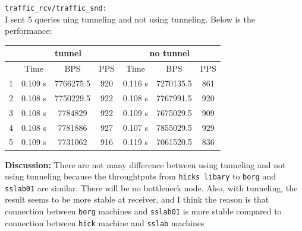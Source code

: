 \documentclass[12pt]{article}
\newenvironment{problem}[2][Problem]{\begin{trivlist}
\item[\hskip \labelsep {\bfseries #1}\hskip \labelsep {\bfseries #2.}]}{\end{trivlist}}
\begin{document}
\begin{problem}{1}
\noindent\texttt{traffic\_rcv/traffic\_snd:} \\
I sent 5 queries uing tunneling and not using tunneling. Below is the performance:
\begin{center}
	\begin{tabular}{c|c|c|c|c|c|c|}
	    & \multicolumn{3}{c|}{tunnel} & \multicolumn{3}{c}{no tunnel} \\ \hline
	    & Time & BPS&  PPS & Time & BPS&  PPS \\ \hline
	1   & 0.109  s& 7766275.5&  920  & 0.116 s& 7270135.5&  861 \\ 
	2   & 0.108  s& 7750229.5&  922& 0.108 s& 7767991.5&  920 \\ 
	3   & 0.108  s& 7784829  &  922& 0.109 s& 7675029.5&  909 \\ 
	4   & 0.108  s& 7781886  &  927& 0.107 s& 7855029.5&  929 \\ 
	5   & 0.109  s& 7731062  &  916& 0.119 s& 7061520.5&  836 \\ 
	\end{tabular}  	
\end{center}
\textbf{Discussion:} There are not many difference between using tunneling and not using tunneling because the throughtputs from \texttt{hicks libary} to \texttt{borg} and \texttt{sslab01} are similar. There will be no bottleneck node. Also, with tunneling, the result seems to be more stable at receiver, and I think the reason is that connection between \texttt{borg} machines and \texttt{sslab01} is more stable compared to connection between \texttt{hick} machine and \texttt{sslab} machines 
\end{problem}


\begin{problem}{2}
	
\end{problem}
\end{document}
